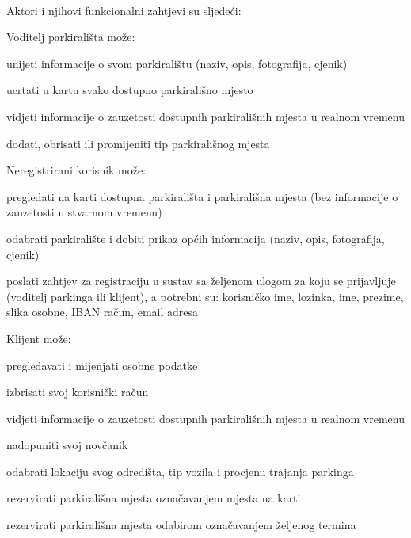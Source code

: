 {	\paragraph*{}{Aktori i njihovi funkcionalni zahtjevi su sljedeći:
	}\begin{packed_enum}
		\item {Voditelj parkirališta može:}
		\begin{packed_item}
			\item {unijeti informacije o svom parkiralištu (naziv, opis, fotografija, cjenik)}
			\item {ucrtati u kartu svako dostupno parkirališno mjesto}
			\item {vidjeti informacije o zauzetosti dostupnih parkirališnih mjesta u realnom vremenu}
			\item {dodati, obrisati ili promijeniti tip parkirališnog mjesta}
		\end{packed_item}
		\item {Neregistrirani korisnik može:}
		\begin{packed_item}
			\item {pregledati na karti dostupna parkirališta i parkirališna mjesta (bez informacije o zauzetosti u stvarnom vremenu)}
			\item {odabrati parkiralište i dobiti prikaz općih informacija (naziv, opis, fotografija, cjenik)}
			\item {poslati zahtjev za registraciju u sustav sa željenom ulogom za koju se prijavljuje (voditelj parkinga ili klijent), a potrebni su: korisničko ime, lozinka, ime, prezime, slika osobne, IBAN račun, email adresa}
		\end{packed_item}
		\item {Klijent može:}
		\begin{packed_item}
			\item {pregledavati i mijenjati osobne podatke}
			\item {izbrisati svoj korisnički račun}
			\item {vidjeti informacije o zauzetosti dostupnih parkirališnih mjesta u realnom vremenu}
			\item {nadopuniti svoj novčanik}
			\item {odabrati lokaciju svog odredišta, tip vozila i procjenu trajanja parkinga}
			\item {rezervirati parkirališna mjesta označavanjem mjesta na karti}
			\item {rezervirati parkirališna mjesta odabirom označavanjem željenog termina}
		\end{packed_item}

\end{packed_enum}}
